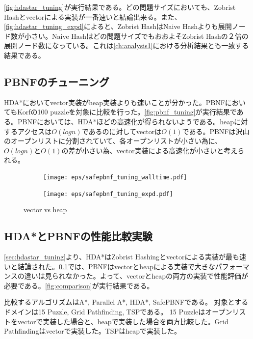 \documentclass{jsarticle}
\begin{document}
\ref{fig:hdastar_tuning}が実行結果である。どの問題サイズにおいても、Zobrist Hashとvectorによる実装が一番速いと結論出来る。また、\ref{fig:hdastar_tuning_expd}によると、Zobrist HashはNaive Hashよりも展開ノード数が小さい。Naive Hashはどの問題サイズでもおおよそZobrist Hashの２倍の展開ノード数になっている。これは\ref{ch:analysis1}における分析結果とも一致する結果である。


\subsection{PBNFのチューニング}
\label{sec:pbnf_tuning}

HDA*においてvector実装がheap実装よりも速いことが分かった。PBNFにおいてもKorfの100 puzzleを対象に比較を行った。\ref{fig:pbnf_tuning}が実行結果である。PBNFにおいては、HDA*ほどの高速化が得られないようである。heapに対するアクセスは$O(logn)$であるのに対してvectorは$O(1)$である。PBNFは沢山のオープンリストに分割されていて、各オープンリストが小さい為に、$O(logn)$と$O(1)$の差が小さい為、vector実装による高速化が小さいと考えられる。


\begin{figure}
	\centering
	\begin{subfigure}{0.4\columnwidth}
		\texttt{[image: eps/safepbnf\_tuning\_walltime.pdf]}
		\label{fig:safepbnf_tuning_walltime}
	\end{subfigure}
	\begin{subfigure}{0.4\columnwidth}
		\texttt{[image: eps/safepbnf\_tuning\_expd.pdf]}
		\label{fig:safepbnf_tuning_expd}
	\end{subfigure}
	\label{fig:safepbnf_tuning}
	\caption{vector vs heap}
\end{figure}

\subsection{HDA*とPBNFの性能比較実験}

\ref{sec:hdastar_tuning}より、HDA*はZobrist Hashingとvectorによる実装が最も速いと結論された。\ref{sec:pbnf_tuning}では、PBNFはvectorとheapによる実装で大きなパフォーマンスの違いは見られなかった。よって、vectorとheapの両方の実装で性能評価が必要である。\ref{fig:comparison}が実行結果である。

比較するアルゴリズムはA*, Parallel A*, HDA*, SafePBNFである。
対象とするドメインは15 Puzzle, Grid Pathfinding, TSPである。
15 Puzzleはオープンリストをvectorで実装した場合と、heapで実装した場合を両方比較した。Grid Pathfindingはvectorで実装した。TSPはheapで実装した。
\end{document}

